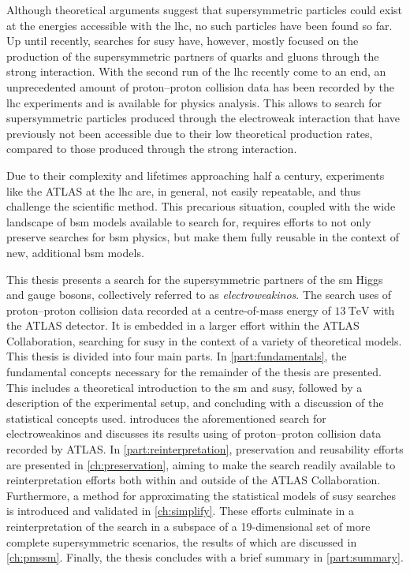 Although theoretical arguments suggest that supersymmetric particles could exist at the energies accessible with the \gls{lhc}, no such particles have been found so far.
Up until recently, searches for \gls{susy} have, however, mostly focused on the production of the supersymmetric partners of quarks and gluons through the strong interaction.
With the second run of the \gls{lhc} recently come to an end, an unprecedented amount of proton--proton collision data has been recorded by the \gls{lhc} experiments and is available for physics analysis.
This allows to search for supersymmetric particles produced through the electroweak interaction that have previously not been accessible due to their low theoretical production rates, compared to those produced through the strong interaction.

Due to their complexity and lifetimes approaching half a century, experiments like the ATLAS at the \gls{lhc} are, in general, not easily repeatable, and thus challenge the scientific method.
This precarious situation, coupled with the wide landscape of \gls{bsm} models available to search for, requires efforts to not only preserve searches for \gls{bsm} physics, but make them fully reusable in the context of new, additional \gls{bsm} models. 

This thesis presents a search for the supersymmetric partners of the \gls{sm} Higgs and gauge bosons, collectively referred to as \textit{electroweakinos}. The search uses \onethirtynineifb of proton--proton collision data recorded at a centre-of-mass energy of $\SI{13}{\TeV}$ with the ATLAS detector.
It is embedded in a larger effort within the ATLAS Collaboration, searching for \gls{susy} in the context of a variety of theoretical models.
This thesis is divided into four main parts.
In \cref{part:fundamentals}, the fundamental concepts necessary for the remainder of the thesis are presented.
This includes a theoretical introduction to the \gls{sm} and \gls{susy}, followed by a description of the experimental setup, and concluding with a discussion of the statistical concepts used.
 introduces the aforementioned search for electroweakinos and discusses its results using \onethirtynineifb of proton--proton collision data recorded by ATLAS.
In \cref{part:reinterpretation}, preservation and reusability efforts are presented in \cref{ch:preservation}, aiming to make the search readily available to reinterpretation efforts both within and outside of the ATLAS Collaboration.
Furthermore, a method for approximating the statistical models of \gls{susy} searches is introduced and validated in \cref{ch:simplify}. These efforts culminate in a reinterpretation of the search in a subspace of a 19-dimensional set of more complete supersymmetric scenarios, the results of which are discussed in \cref{ch:pmssm}.
Finally, the thesis concludes with a brief summary in \cref{part:summary}.

